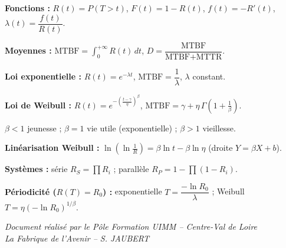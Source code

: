 \documentclass[a4paper,11pt]{article}
\begin{document}
\begin{tcolorbox}[colback=uimmlightblue, colframe=uimmblue, title={\textbf{Formulaire de fiabilité}}, fonttitle=\large\bfseries\sffamily, coltitle=white, boxrule=1.5pt, arc=5pt]

\textbf{Fonctions :} $R(t) = P(T>t)$, \; $F(t) = 1 - R(t)$, \; $f(t) = -R'(t)$, \; $\lambda(t) = \dfrac{f(t)}{R(t)}$.

\vspace{5pt}
\textbf{Moyennes :} $\text{MTBF} = \displaystyle\int_0^{+\infty} R(t)\,dt$, \; $D = \dfrac{\text{MTBF}}{\text{MTBF} + \text{MTTR}}$.

\vspace{5pt}
\textbf{Loi exponentielle :} $R(t) = e^{-\lambda t}$, \; $\text{MTBF} = \dfrac{1}{\lambda}$, \; $\lambda$ constant.

\vspace{5pt}
\textbf{Loi de Weibull :} $R(t) = e^{-\left(\frac{t-\gamma}{\eta}\right)^{\beta}}$, \; $\text{MTBF} = \gamma + \eta\,\Gamma\!\left(1 + \tfrac{1}{\beta}\right)$.

\vspace{3pt}
$\beta < 1$ jeunesse \; ; \; $\beta = 1$ vie utile (exponentielle) \; ; \; $\beta > 1$ vieillesse.

\vspace{5pt}
\textbf{Linéarisation Weibull :} $\ln\!\left(\ln\frac{1}{R}\right) = \beta\ln t - \beta\ln\eta$ \; (droite $Y = \beta X + b$).

\vspace{5pt}
\textbf{Systèmes :} série $R_S = \prod R_i$ \; ; \; parallèle $R_P = 1 - \prod (1 - R_i)$.

\vspace{5pt}
\textbf{Périodicité ($R(T) = R_0$) :} exponentielle $T = \dfrac{-\ln R_0}{\lambda}$ \; ; \; Weibull $T = \eta(-\ln R_0)^{1/\beta}$.
\end{tcolorbox}

\vfill
\begin{center}
\color{uimmgray}\small
\textit{Document réalisé par le Pôle Formation UIMM -- Centre-Val de Loire}\\
\textit{La Fabrique de l'Avenir -- S. JAUBERT}
\end{center}
\end{document}
